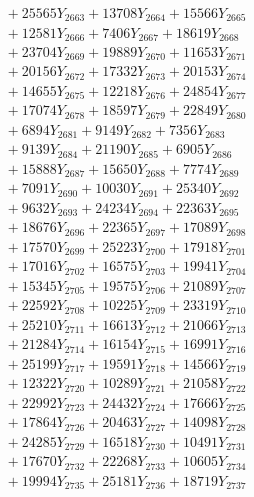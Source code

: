 \documentclass[a4paper,10pt]{article}
\begin{document}
{\begin{align}
&\;  + 25565 Y_{2663} + 13708 Y_{2664} + 15566 Y_{2665} \\[0.3ex]
&\;  + 12581 Y_{2666} + 7406 Y_{2667} + 18619 Y_{2668} \\[0.5ex]\allowbreak
&\;  + 23704 Y_{2669} + 19889 Y_{2670} + 11653 Y_{2671} \\[0.3ex]
&\;  + 20156 Y_{2672} + 17332 Y_{2673} + 20153 Y_{2674} \\[0.3ex]
&\;  + 14655 Y_{2675} + 12218 Y_{2676} + 24854 Y_{2677} \\[0.3ex]
&\;  + 17074 Y_{2678} + 18597 Y_{2679} + 22849 Y_{2680} \\[0.3ex]
&\;  + 6894 Y_{2681} + 9149 Y_{2682} + 7356 Y_{2683} \\[0.3ex]
&\;  + 9139 Y_{2684} + 21190 Y_{2685} + 6905 Y_{2686} \\[0.3ex]
&\;  + 15888 Y_{2687} + 15650 Y_{2688} + 7774 Y_{2689} \\[0.3ex]
&\;  + 7091 Y_{2690} + 10030 Y_{2691} + 25340 Y_{2692} \\[0.3ex]
&\;  + 9632 Y_{2693} + 24234 Y_{2694} + 22363 Y_{2695} \\[0.3ex]
&\;  + 18676 Y_{2696} + 22365 Y_{2697} + 17089 Y_{2698} \\[0.5ex]\allowbreak
&\;  + 17570 Y_{2699} + 25223 Y_{2700} + 17918 Y_{2701} \\[0.3ex]
&\;  + 17016 Y_{2702} + 16575 Y_{2703} + 19941 Y_{2704} \\[0.3ex]
&\;  + 15345 Y_{2705} + 19575 Y_{2706} + 21089 Y_{2707} \\[0.3ex]
&\;  + 22592 Y_{2708} + 10225 Y_{2709} + 23319 Y_{2710} \\[0.3ex]
&\;  + 25210 Y_{2711} + 16613 Y_{2712} + 21066 Y_{2713} \\[0.3ex]
&\;  + 21284 Y_{2714} + 16154 Y_{2715} + 16991 Y_{2716} \\[0.3ex]
&\;  + 25199 Y_{2717} + 19591 Y_{2718} + 14566 Y_{2719} \\[0.3ex]
&\;  + 12322 Y_{2720} + 10289 Y_{2721} + 21058 Y_{2722} \\[0.3ex]
&\;  + 22992 Y_{2723} + 24432 Y_{2724} + 17666 Y_{2725} \\[0.3ex]
&\;  + 17864 Y_{2726} + 20463 Y_{2727} + 14098 Y_{2728} \\[0.5ex]\allowbreak
&\;  + 24285 Y_{2729} + 16518 Y_{2730} + 10491 Y_{2731} \\[0.3ex]
&\;  + 17670 Y_{2732} + 22268 Y_{2733} + 10605 Y_{2734} \\[0.3ex]
&\;  + 19994 Y_{2735} + 25181 Y_{2736} + 18719 Y_{2737} \\[0.3ex]

\end{align}}
\end{document}
